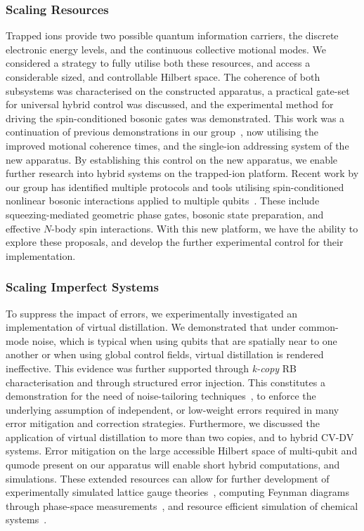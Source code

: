 \subsubsection{Scaling Resources}
Trapped ions provide two possible quantum information carriers, the discrete electronic energy levels, and the continuous collective motional modes. We considered a strategy to fully utilise both these resources, and access a considerable sized, and controllable Hilbert space. The coherence of both subsystems was characterised on the constructed apparatus, a practical gate-set for universal hybrid control was discussed, and the experimental method for driving the spin-conditioned bosonic gates was demonstrated. This work was a continuation of previous demonstrations in our group~\cite{bazavan_squeezing_2026,saner_generating_2026,saner_aharonovbohm_2026}, now utilising the improved motional coherence times, and the single-ion addressing system of the new apparatus. By establishing this control on the new apparatus, we enable further research into hybrid systems on the trapped-ion platform. Recent work by our group has identified multiple protocols and tools utilising spin-conditioned nonlinear bosonic interactions applied to multiple qubits~\cite{shinbrough_applications_2026}. These include squeezing-mediated geometric phase gates, bosonic state preparation, and effective $N$-body spin interactions. With this new platform, we have the ability to explore these proposals, and develop the further experimental control for their implementation.


\subsubsection{Scaling Imperfect Systems}
To suppress the impact of errors, we experimentally investigated an implementation of virtual distillation. We demonstrated that under common-mode noise, which is typical when using qubits that are spatially near to one another or when using global control fields, virtual distillation is rendered ineffective. This evidence was further supported through \emph{k-copy} RB characterisation and through structured error injection. This constitutes a demonstration for the need of noise-tailoring techniques~\cite{wallman_noise_2016}, to enforce the underlying assumption of independent, or low-weight errors required in many error mitigation and correction strategies. Furthermore, we discussed the application of virtual distillation to more than two copies, and to hybrid CV-DV systems. Error mitigation on the large accessible Hilbert space of multi-qubit and qumode present on our apparatus will enable short hybrid computations, and simulations. These extended resources can allow for further development of experimentally simulated lattice gauge theories~\cite{saner_aharonovbohm_2026,bazavan_synthetic_2024}, computing Feynman diagrams through phase-space measurements~\cite{varona_towards_2024}, and resource efficient simulation of chemical systems~\cite{kang_seeking_2024,navickas_experimental_2025,olaya-agudelo_simulating_2025}.

